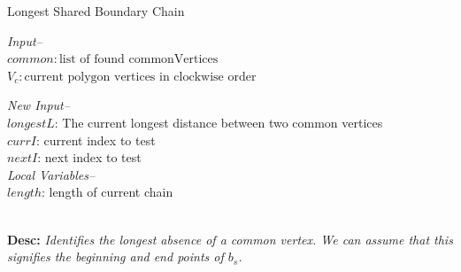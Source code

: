\begin{algorithm}[t]
\footnotesize
\caption{Longest Shared Boundary Chain}
\textit{Input--}\\
$common: \text{list of found commonVertices}$\\
$V_c: \text{current polygon vertices in clockwise order}$
\begin{algorithmic}[1]
\IfEnd
{}
\IfEnd
{}

\EndProcedure
\end{algorithmic}
\textit{New Input--}\\
$longestL$: The current longest distance between two common vertices\\
$currI$: current index to test\\
$nextI$: next index to test\\
\textit{Local Variables--}\\
$length$: length of current chain 
\begin{algorithmic}[1]
\IfEnd
{}
\Else
{}
\IfEnd
\EndProcedure
\end{algorithmic} \label{alg:sharedBoundary2}

~\\
\textbf{Desc: }\emph{Identifies the longest absence of a common vertex. We can assume that this signifies the beginning and end points of $b_{s}$. }
\end{algorithm}

